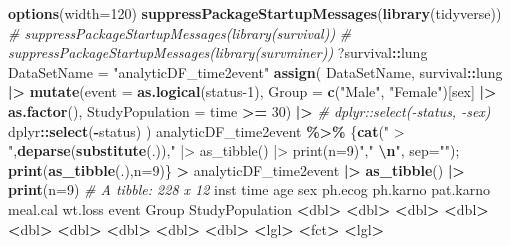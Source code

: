 \documentclass[
]{article}
\newenvironment{Shaded}{\begin{snugshade}}{\end{snugshade}}
\newcommand{\AttributeTok}[1]{\textcolor[rgb]{0.13,0.29,0.53}{#1}}
\newcommand{\CommentTok}[1]{\textcolor[rgb]{0.56,0.35,0.01}{\textit{#1}}}
\newcommand{\DecValTok}[1]{\textcolor[rgb]{0.00,0.00,0.81}{#1}}
\newcommand{\ErrorTok}[1]{\textcolor[rgb]{0.64,0.00,0.00}{\textbf{#1}}}
\newcommand{\FunctionTok}[1]{\textcolor[rgb]{0.13,0.29,0.53}{\textbf{#1}}}
\newcommand{\NormalTok}[1]{#1}
\newcommand{\OtherTok}[1]{\textcolor[rgb]{0.56,0.35,0.01}{#1}}
\newcommand{\SpecialCharTok}[1]{\textcolor[rgb]{0.81,0.36,0.00}{\textbf{#1}}}
\newcommand{\StringTok}[1]{\textcolor[rgb]{0.31,0.60,0.02}{#1}}
\begin{document}
\begin{Shaded}
\begin{Highlighting}[]
\FunctionTok{options}\NormalTok{(}\AttributeTok{width=}\DecValTok{120}\NormalTok{)}
\FunctionTok{suppressPackageStartupMessages}\NormalTok{(}\FunctionTok{library}\NormalTok{(tidyverse))}
\CommentTok{\# suppressPackageStartupMessages(library(survival))}
\CommentTok{\# suppressPackageStartupMessages(library(survminer))}
\NormalTok{?survival}\SpecialCharTok{::}\NormalTok{lung}
\NormalTok{DataSetName }\OtherTok{=} \StringTok{"analyticDF\_time2event"}
\FunctionTok{assign}\NormalTok{(}
\NormalTok{    DataSetName, }
\NormalTok{    survival}\SpecialCharTok{::}\NormalTok{lung }\SpecialCharTok{|\textgreater{}} \FunctionTok{mutate}\NormalTok{(}\AttributeTok{event =} \FunctionTok{as.logical}\NormalTok{(status}\DecValTok{{-}1}\NormalTok{), }\AttributeTok{Group =} \FunctionTok{c}\NormalTok{(}\StringTok{"Male"}\NormalTok{, }\StringTok{"Female"}\NormalTok{)[sex] }\SpecialCharTok{|\textgreater{}} \FunctionTok{as.factor}\NormalTok{(), }\AttributeTok{StudyPopulation =}\NormalTok{ time }\SpecialCharTok{\textgreater{}=} \DecValTok{30}\NormalTok{) }\SpecialCharTok{|\textgreater{}}
        \CommentTok{\# dplyr::select({-}status, {-}sex)}
\NormalTok{        dplyr}\SpecialCharTok{::}\FunctionTok{select}\NormalTok{(}\SpecialCharTok{{-}}\NormalTok{status)}
\NormalTok{)}
\NormalTok{analyticDF\_time2event }\SpecialCharTok{\%\textgreater{}\%}\NormalTok{ \{}\FunctionTok{cat}\NormalTok{(}\StringTok{" \textgreater{} "}\NormalTok{,}\FunctionTok{deparse}\NormalTok{(}\FunctionTok{substitute}\NormalTok{(.)),}\StringTok{" |\textgreater{} as\_tibble() |\textgreater{} print(n=9)"}\NormalTok{,}\StringTok{"  }\SpecialCharTok{\textbackslash{}n}\StringTok{"}\NormalTok{, }\AttributeTok{sep=}\StringTok{""}\NormalTok{); }\FunctionTok{print}\NormalTok{(}\FunctionTok{as\_tibble}\NormalTok{(.),}\AttributeTok{n=}\DecValTok{9}\NormalTok{)\}}
 \SpecialCharTok{\textgreater{}}\NormalTok{ analyticDF\_time2event }\SpecialCharTok{|\textgreater{}} \FunctionTok{as\_tibble}\NormalTok{() }\SpecialCharTok{|\textgreater{}} \FunctionTok{print}\NormalTok{(}\AttributeTok{n=}\DecValTok{9}\NormalTok{)  }
\CommentTok{\# A tibble: 228 x 12}
\NormalTok{   inst  time   age   sex ph.ecog ph.karno pat.karno meal.cal wt.loss event Group  StudyPopulation}
  \SpecialCharTok{\textless{}}\NormalTok{dbl}\SpecialCharTok{\textgreater{}} \ErrorTok{\textless{}}\NormalTok{dbl}\SpecialCharTok{\textgreater{}} \ErrorTok{\textless{}}\NormalTok{dbl}\SpecialCharTok{\textgreater{}} \ErrorTok{\textless{}}\NormalTok{dbl}\SpecialCharTok{\textgreater{}}   \ErrorTok{\textless{}}\NormalTok{dbl}\SpecialCharTok{\textgreater{}}    \ErrorTok{\textless{}}\NormalTok{dbl}\SpecialCharTok{\textgreater{}}     \ErrorTok{\textless{}}\NormalTok{dbl}\SpecialCharTok{\textgreater{}}    \ErrorTok{\textless{}}\NormalTok{dbl}\SpecialCharTok{\textgreater{}}   \ErrorTok{\textless{}}\NormalTok{dbl}\SpecialCharTok{\textgreater{}} \ErrorTok{\textless{}}\NormalTok{lgl}\SpecialCharTok{\textgreater{}} \ErrorTok{\textless{}}\NormalTok{fct}\SpecialCharTok{\textgreater{}}  \ErrorTok{\textless{}}\NormalTok{lgl}\SpecialCharTok{\textgreater{}}          

\end{Highlighting}
\end{Shaded}
\end{document}
